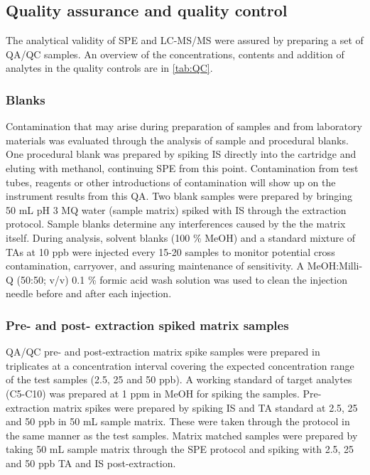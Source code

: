 

\subsection{Quality assurance and quality control}
The analytical validity of SPE and LC-MS/MS were assured by preparing a set of QA/QC samples. An overview of the concentrations, contents and addition of analytes in the quality controls are in \cref{tab:QC}.

\subsubsection{Blanks}
Contamination that may arise during preparation of samples and from laboratory materials was evaluated through the analysis of sample and procedural blanks. One procedural blank was prepared by spiking IS directly into the cartridge and eluting with methanol, continuing SPE from this point. Contamination from test tubes, reagents or other introductions of contamination will show up on the instrument results from this QA. Two blank samples were prepared by bringing 50 mL pH 3 MQ water (sample matrix) spiked with IS through the extraction protocol. Sample blanks determine any interferences caused by the the matrix itself. During analysis, solvent blanks (100 \% MeOH) and a standard mixture of TAs at 10 ppb were injected every 15-20 samples to monitor potential cross contamination, carryover, and assuring maintenance of sensitivity. A MeOH:Milli-Q (50:50; v/v) 0.1 \% formic acid wash solution was used to clean the injection needle before and after each injection.

\subsubsection{Pre- and post- extraction spiked matrix samples}
QA/QC pre- and post-extraction matrix spike samples were prepared in triplicates at a concentration interval covering the expected concentration range of the test samples (2.5, 25 and 50 ppb). A working standard of target analytes (C5-C10) was prepared at 1 ppm in MeOH for spiking the samples. Pre-extraction matrix spikes were prepared by spiking IS and TA standard at 2.5, 25 and 50 ppb in 50 mL sample matrix. These were taken through the protocol in the same manner as the test samples. Matrix matched samples were prepared by taking 50 mL sample matrix through the SPE protocol and spiking with 2.5, 25 and 50 ppb TA and IS post-extraction. 


